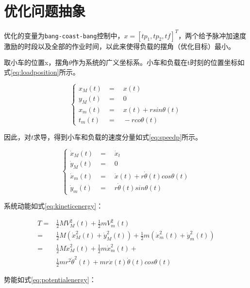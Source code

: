 \documentclass[]{ctexbook}
\theoremstyle{definition}
\theoremstyle{definition}
\theoremstyle{definition}
\theoremstyle{remark}
\begin{document}
\section{优化问题抽象}

优化的变量为\texttt{bang-coast-bang}控制中，\(x = [tp_1,tp_2,tf]^T\)，两个给予脉冲加速度激励的时段以及全部的作业时间，以此来使得负载的摆角（优化目标）最小。

取小车的位置x，摆角\(\theta\)作为系统的广义坐标系。小车和负载在t时刻的位置坐标如式\eqref{eq:loadposition}所示。

\begin{equation}
\begin{cases} 
x_M(t)&=\quad x(t)\\ 
y_M(t)&=\quad 0 \\
x_m(t)&=\quad x(t)+rsin\theta(t)\\
t_m(t)&=\quad -rco\theta(t)
\end{cases}
\label{eq:loadposition}
\end{equation}

因此，对\(t\)求导，得到小车和负载的速度分量如式\eqref{eq:speedp}所示。

\begin{equation}
\begin{cases} 
\dot{x}_M(t) &=\quad \dot{x}_t\\
\dot{y}_M(t) &=\quad 0\\
\dot{x}_m(t) &=\quad \dot{x}(t)+r\dot{\theta}(t)cos\theta(t)\\
\dot{y}_m(t) &=\quad r\dot{\theta}(t)sin\theta(t)
\end{cases}
\label{eq:speedp}
\end{equation}

系统动能如式\eqref{eq:kineticenergy}：

\begin{equation}
\begin{split}
T  = &\frac{1}{2}MV_M^2(t) + \frac{1}{2}mV_m^2(t) \\
=&\frac{1}{2}M(\dot{x}_M^2(t)+\dot{y}_M^2(t))+\frac{1}{2}m(\dot{x}_m^2(t)+\dot{y}_m^2(t))\\
=&\frac{1}{2}M\dot{x}_M^2(t) + \frac{1}{2}m\dot{x}_m^2(t) + \\
&\frac{1}{2}mr^2\dot{\theta}^2(t) + mr\dot{x}(t)\dot{\theta}(t)cos\theta(t)
\end{split}
\label{eq:kineticenergy}
\end{equation}

势能如式\eqref{eq:potentialenergy}：
\end{document}
